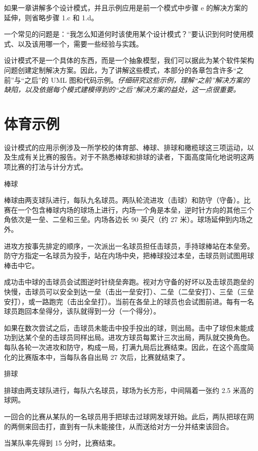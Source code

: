 如果一章讲解多个设计模式，并且示例应用是前一个模式中步骤 e 的解决方案的延伸，则省略步骤 1.c 和 1.d。

一个常见的问题是：“我怎么知道何时该使用某个设计模式？”要认识到何时使用模式、以及该用哪一个，需要一些经验与实践。

设计模式不是一个具体的东西，而是一个抽象模型，我们可以据此为某个软件架构问题创建定制解决方案。因此，为了讲解这些模式，本部分的各章包含许多“之前”与“之后”的 UML 图和代码示例。\emph{仔细研究这些示例，理解“之前”解决方案的缺陷，以及依据每个模式建模得到的“之后”解决方案的益处，这一点很重要。}

\section*{体育示例}

设计模式的应用示例涉及一所学校的体育部、棒球、排球和橄榄球这三项运动，以及生成有关比赛的报告。对于不熟悉棒球和排球的读者，下面高度简化地说明这两项比赛的打法与计分方式。

\begin{mySidebar}{棒球}

棒球由两支球队进行，每队九名球员。两队轮流进攻（击球）和防守（守备）。比赛在一个包含棒球内场的球场上进行，内场一个角是本垒，逆时针方向的其他三个角依次是一垒、二垒和三垒。内场各边长 90 英尺（约 27 米）。球场延伸到内场之外。

进攻方按事先排定的顺序，一次派出一名球员担任击球员，手持球棒站在本垒旁。防守方指定一名球员为投手，站在内场中央，把棒球投过本垒，击球员则试图用球棒击中它。

成功击中球的击球员会试图逆时针绕垒奔跑。视对方守备的好坏以及击球员跑垒的快慢，击球员可以安全到达一垒（击出一垒安打）、二垒（二垒安打）、三垒（三垒安打），或一路跑完（击出全垒打）。当前在各垒上的球员也会试图前进。每有一名球员跑回本垒得分，该队就得到一分（一个得分）。

如果在数次尝试之后，击球员未能击中投手投出的球，则出局。击中了球但未能成功到达某个垒的击球员同样出局。进攻方球员每累计三次出局，两队就交换角色。每队各轮一次进攻和防守，构成一局，打满九局后比赛结束。因此，在这个高度简化的比赛版本中，当每队各自出局 27 次后，比赛就结束了。
\end{mySidebar}

\begin{mySidebar}{排球}

排球由两支球队进行，每队六名球员，球场为长方形，中间隔着一张约 2.5 米高的球网。

一回合的比赛从某队的一名球员用手把球击过球网发球开始。此后，两队把球在网的两侧来回击打，直到有一队未能接住，从而送给对方一分并结束该回合。

当某队率先得到 15 分时，比赛结束。
\end{mySidebar}
